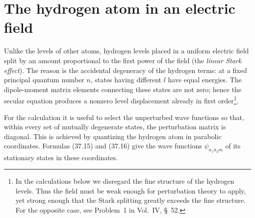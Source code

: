 \section{The hydrogen atom in an electric field}

Unlike the levels of other atoms, hydrogen levels placed in a uniform electric field split by an amount proportional to the first power of the field (the \emph{linear Stark effect}). The reason is the accidental degeneracy of the hydrogen terms: at a fixed principal quantum number $n$, states having different $l$ have equal energies. The dipole-moment matrix elements connecting these states are not zero; hence the secular equation produces a nonzero level displacement already in first order\footnote{In the calculations below we disregard the fine structure of the hydrogen levels. Thus the field must be weak enough for perturbation theory to apply, yet strong enough that the Stark splitting greatly exceeds the fine structure. For the opposite case, see Problem~1 in Vol.~IV, \S~52.}.

For the calculation it is useful to select the unperturbed wave functions so that, within every set of mutually degenerate states, the perturbation matrix is diagonal. This is achieved by quantizing the hydrogen atom in parabolic coordinates. Formulas (37.15) and (37.16) give the wave functions $\psi_{n_1n_2m}$ of its stationary states in these coordinates.

